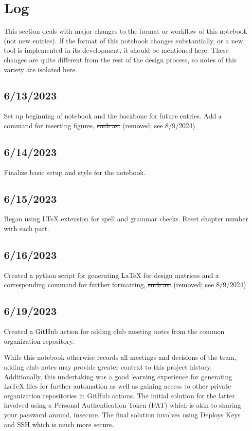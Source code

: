 \section{Log}
This section deals with major changes to the format or workflow of this notebook
(not new entries). If the format of this notebook changes substantially, or a
new tool is implemented in its development, it should be mentioned here. These
changes are quite different from the rest of the design process, so notes of
this variety are isolated here.
\subsection{6/13/2023}
Set up beginning of notebook and the backbone for future entries. Add a command
for inserting figures, \sout{such as:} (removed; see 8/9/2024)
\subsection{6/14/2023}
Finalize basic setup and style for the notebook.
\subsection{6/15/2023}
Began using LTeX \cite{bib:ltex} extension for spell and grammar checks. Reset
chapter number with each part.
\subsection{6/16/2023}
Created a python script for generating \LaTeX{} for design matrices and a
corresponding command for further formatting, \sout{such as:} (removed; see 8/9/2024)
\subsection{6/19/2023}
Created a GitHub action for adding club meeting notes from the common
organization repository.

While this notebook otherwise records all meetings and decisions of the team,
adding club notes may provide greater context to this project history.
Additionally, this undertaking was a good learning experience for generating
\LaTeX{} files for further automation as well as gaining access to other private
organization repositories in GitHub actions. The initial solution for the latter
involved using a Personal Authentication Token (PAT) which is akin to sharing
your password around, insecure. The final solution involves using Deploys Keys
and SSH which is much more secure.
